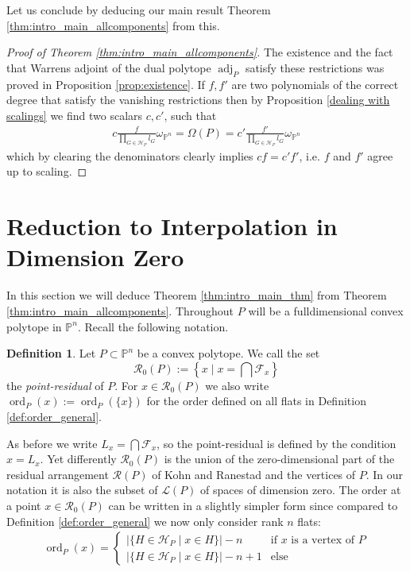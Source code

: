 \documentclass[a4paper,10pt]{amsart}
\theoremstyle{definition}
\newtheorem{defin}{Definition}[section]
\theoremstyle{plain}
\newcommand{\ord}{\operatorname{ord}}
\newcommand{\adj}{\operatorname{adj}} %
\newcommand{\cF}{{\mathcal F}}
\newcommand{\cH}{{\mathcal H}}
\newcommand{\cL}{{\mathcal L}}
\newcommand{\cR}{{\mathcal R}}
\newcommand{\pp}{\mathbb{P}}
\begin{document}
Let us conclude by deducing our main result Theorem \ref{thm:intro_main_allcomponents} from this.
 \begin{proof}[Proof of Theorem \ref{thm:intro_main_allcomponents}]
     The existence and the fact that Warrens adjoint of the dual polytope $\adj_P$ satisfy these restrictions was proved in Proposition \ref{prop:existence}. If $f,f'$ are two polynomials of the correct degree that satisfy the vanishing restrictions then by Proposition \ref{dealing with scalings} we find two scalars $c,c'$, such that \begin{align*}
         c\frac{f}{\prod_{G\in \cH_P}l_G}\omega_{\pp^n}= \Omega(P)= c'\frac{f'}{\prod_{G\in \cH_P}l_G}\omega_{\pp^n}
     \end{align*}
     which by clearing the denominators clearly implies $cf=c'f'$, i.e. $f$ and $f'$ agree up to scaling.
 \end{proof}
 
\section{Reduction to Interpolation in Dimension Zero } \label{sec: main_cor_Clemens}
In this section we will deduce Theorem \ref{thm:intro_main_thm} from Theorem \ref{thm:intro_main_allcomponents}. Throughout $P$ will be a fulldimensional convex polytope in $\pp^n$. Recall the following notation.
\begin{defin}
 Let $P \subset \pp^n$ be a convex polytope. We call the set
 \begin{equation*}
     \cR_0(P) := \left\lbrace x \mid x = \bigcap\cF_x \right\rbrace
 \end{equation*}
 the \emph{point-residual} of $P$. For $x\in \cR_0(P)$ we also write $\ord_P(x):=\ord_P(\{x\})$ for the order defined on all flats in Definition \ref{def:order_general}.
\end{defin}
As before we write $L_x = \bigcap\cF_x$, so the point-residual is defined by the condition $x = L_x$. Yet differently $\cR_0(P)$ is the union of the zero-dimensional part of the residual arrangement $\cR(P)$ of Kohn and Ranestad \cite{KohnRanestad2019AdjCurves} and the vertices of $P$. In our notation it is also the subset of $\cL(P)$ of spaces of dimension zero. The order at a point $x \in \cR_0(P)$ can be written in a slightly simpler form since compared to Definition \ref{def:order_general} we now only consider rank $n$ flats: \begin{align*}
    \ord_P(x)=\begin{cases}
        |\{H\in \cH_P \mid x \in H\}|-n & \text{if }x\text{ is a vertex of }P \\
        |\{H\in \cH_P \mid x \in H\}|-n+1 &\text{else}
    \end{cases}
\end{align*}
\end{document}

